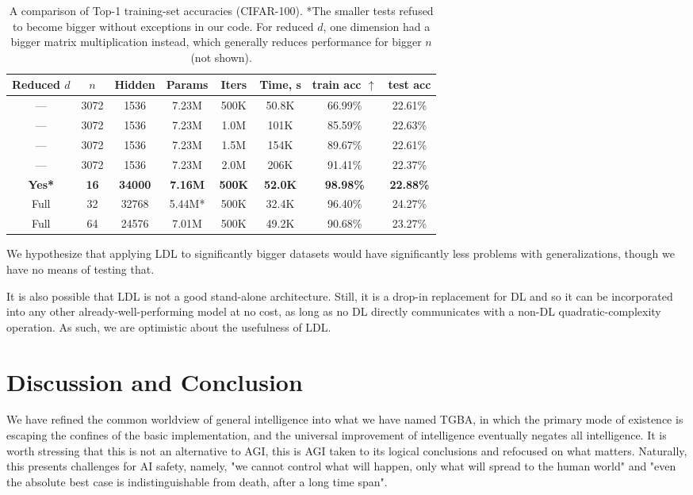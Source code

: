 \documentclass{article}
\begin{document}
\begin{table}
\begin{center}
\begin{tabular}{cccccccc}
\hline
Reduced $d$ & $n$ & Hidden & Params & Iters & Time, s & train acc $\uparrow$ & test acc \\
\hline
--- & 3072 & 1536 & 7.23M & 500K & 50.8K & 66.99\% & 22.61\% \\
--- & 3072 & 1536 & 7.23M & 1.0M & 101K & 85.59\% & 22.63\% \\
--- & 3072 & 1536 & 7.23M & 1.5M & 154K & 89.67\% & 22.61\% \\
--- & 3072 & 1536 & 7.23M & 2.0M & 206K & 91.41\% & 22.37\% \\
\hline
\textbf{Yes*} & \textbf{16} & \textbf{34000} & \textbf{7.16M} & \textbf{500K} & \textbf{52.0K} & \textbf{98.98\%} & \textbf{22.88\%} \\
Full & 32 & 32768 & 5.44M* & 500K & 32.4K & 96.40\% & 24.27\% \\
Full & 64 & 24576 & 7.01M & 500K & 49.2K & 90.68\% & 23.27\% \\
\hline
\end{tabular}
\end{center}
\caption{A comparison of Top-1 training-set accuracies (CIFAR-100). *The smaller tests refused to become bigger without exceptions in our code. For reduced $d$, one dimension had a bigger matrix multiplication instead, which generally reduces performance for bigger $n$ (not shown).}
\label{LDLimages}
\end{table}

We hypothesize that applying LDL to significantly bigger datasets would have significantly less problems with generalizations, though we have no means of testing that.

It is also possible that LDL is not a good stand-alone architecture. Still, it is a drop-in replacement for DL and so it can be incorporated into any other already-well-performing model at no cost, as long as no DL directly communicates with a non-DL quadratic-complexity operation. As such, we are optimistic about the usefulness of LDL.

\section{Discussion and Conclusion}

We have refined the common worldview of general intelligence into what we have named TGBA, in which the primary mode of existence is escaping the confines of the basic implementation, and the universal improvement of intelligence eventually negates all intelligence. It is worth stressing that this is not an alternative to AGI, this is AGI taken to its logical conclusions and refocused on what matters. Naturally, this presents challenges for AI safety, namely, "we cannot control what will happen, only what will spread to the human world" and "even the absolute best case is indistinguishable from death, after a long time span".
\end{document}
